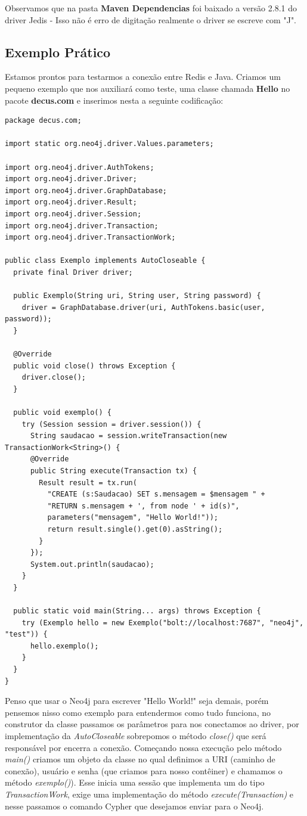 Observamos que na pasta \textbf{Maven Dependencias} foi baixado a versão 2.8.1 do driver Jedis - Isso não é erro de digitação realmente o driver se escreve com "J".

\subsection{Exemplo Prático}
Estamos prontos para testarmos a conexão entre Redis e Java. Criamos um pequeno exemplo que nos auxiliará como teste, uma classe chamada \textbf{Hello} no pacote \textbf{decus.com} e inserimos nesta a seguinte codificação:
\begin{lstlisting}[]
package decus.com;

import static org.neo4j.driver.Values.parameters;

import org.neo4j.driver.AuthTokens;
import org.neo4j.driver.Driver;
import org.neo4j.driver.GraphDatabase;
import org.neo4j.driver.Result;
import org.neo4j.driver.Session;
import org.neo4j.driver.Transaction;
import org.neo4j.driver.TransactionWork;

public class Exemplo implements AutoCloseable {
  private final Driver driver;
  
  public Exemplo(String uri, String user, String password) {
    driver = GraphDatabase.driver(uri, AuthTokens.basic(user, password));
  }
  
  @Override
  public void close() throws Exception {
    driver.close();
  }
  
  public void exemplo() {
    try (Session session = driver.session()) {
      String saudacao = session.writeTransaction(new TransactionWork<String>() {
      @Override
      public String execute(Transaction tx) {
        Result result = tx.run(
          "CREATE (s:Saudacao) SET s.mensagem = $mensagem " + 
          "RETURN s.mensagem + ', from node ' + id(s)",
          parameters("mensagem", "Hello World!"));
          return result.single().get(0).asString();
        }
      });
      System.out.println(saudacao);
    }
  }

  public static void main(String... args) throws Exception {
    try (Exemplo hello = new Exemplo("bolt://localhost:7687", "neo4j", "test")) {
      hello.exemplo();
    }
  }
}
\end{lstlisting}

Penso que usar o Neo4j para escrever "Hello World!" seja demais, porém pensemos nisso como exemplo para entendermos como tudo funciona, no construtor da classe passamos os parâmetros para nos conectamos ao driver, por implementação da \textit{AutoCloseable} sobrepomos o método \textit{close()} que será responsável por encerra a conexão. Começando nossa execução pelo método \textit{main()} criamos um objeto da classe no qual definimos a URI (caminho de conexão), usuário e senha (que criamos para nosso contêiner) e chamamos o método \textit{exemplo()}). Esse inicia uma sessão que implementa um do tipo \textit{TransactionWork}, exige uma implementação do método \textit{execute(Transaction)} e nesse passamos o comando Cypher que desejamos enviar para o Neo4j.

